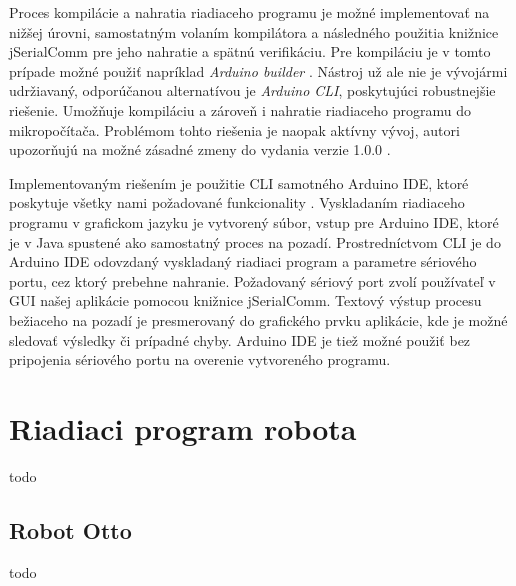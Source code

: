 Proces kompilácie a nahratia riadiaceho programu je možné implementovať na nižšej úrovni, samostatným volaním kompilátora a následného použitia knižnice jSerialComm pre jeho nahratie a spätnú verifikáciu. Pre kompiláciu je v tomto prípade možné použiť napríklad \textit{Arduino builder} \cite{arduinoBuilder}. Nástroj už ale nie je vývojármi udržiavaný, odporúčanou alternatívou je \textit{Arduino CLI}, poskytujúci robustnejšie riešenie. Umožňuje kompiláciu a zároveň i nahratie riadiaceho programu do mikropočítača. Problémom tohto riešenia je naopak aktívny vývoj, autori upozorňujú na možné zásadné zmeny do vydania verzie 1.0.0 \cite{arduinoCli}.

Implementovaným riešením je použitie CLI samotného Arduino IDE, ktoré poskytuje všetky nami požadované funkcionality \cite{arduinoIdeCli}. Vyskladaním riadiaceho programu v grafickom jazyku je vytvorený súbor, vstup pre Arduino IDE, ktoré je v Java spustené ako samostatný proces na pozadí. Prostredníctvom CLI je do Arduino IDE odovzdaný vyskladaný riadiaci program a parametre sériového portu, cez ktorý prebehne nahranie. Požadovaný sériový port zvolí používateľ v GUI našej aplikácie pomocou knižnice jSerialComm. Textový výstup procesu bežiaceho na pozadí je presmerovaný do grafického prvku aplikácie, kde je možné sledovať výsledky či prípadné chyby. Arduino IDE je tiež možné použiť bez pripojenia sériového portu na overenie vytvoreného programu.


\section{Riadiaci program robota}
todo

\subsection{Robot Otto}
todo














